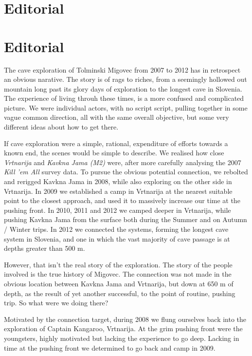 \chapter*{Editorial}

\chapter*{Editorial}

The cave exploration of Tolminski Migovec from 2007 to 2012 has in
retrospect an obvious narative. The story is of rags to riches, from a
seemingly hollowed out mountain long past its glory days of exploration
to the longest cave in Slovenia. The experience of living throuh these
times, is a more confused and complicated picture. We were individual
actors, with no script script, pulling together in some vague common
direction, all with the same overall objective, but some very different
ideas about how to get there.

If cave exploration were a simple, rational, expenditure of efforts
towards a known end, the scenes would be simple to describe. We realised
how close \emph{Vrtnarija} and \emph{Kavkna Jama (M2)} were, after more
carefully analysing the 2007 \emph{Kill 'em All} survey data. To pursue
the obvious potential connection, we rebolted and rerigged Kavkna Jama
in 2008, while also exploring on the other side in Vrtnarija. In 2009 we
established a camp in Vrtnarija at the nearest suitable point to the
closest approach, and used it to massively increase our time at the
pushing front. In 2010, 2011 and 2012 we camped deeper in Vrtnarija,
while pushing Kavkna Jama from the surface both during the Summer and on
Autumn / Winter trips. In 2012 we connected the systems, forming the
longest cave system in Slovenia, and one in which the vast majority of
cave passage is at depths greater than 500 m.

However, that isn't the real story of the exploration. The story of the
people involved is the true history of Migovec. The connection was not
made in the obvious location between Kavkna Jama and Vrtnarija, but down
at 650 m of depth, as the result of yet another successful, to the point
of routine, pushing trip. So what were we doing there?

Motivated by the connection target, during 2008 we flung ourselves back
into the exploration of Captain Kangaroo, Vrtnarija. At the grim pushing
front were the youngsters, highly motivated but lacking the experience
to go deep. Lacking in time at the pushing front we determined to go
back and camp in 2009.

